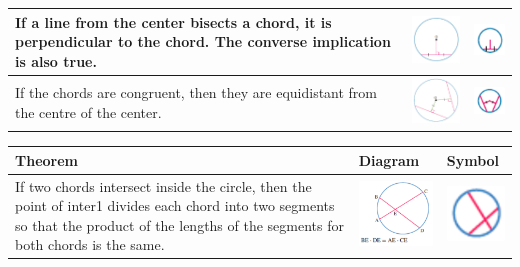 \documentclass{book}
\begin{document}
\begin{center}
\begin{tabular}[center]{|p{5cm}|p{3cm}|p{2cm}|}
		If a line from the center bisects a chord, it is perpendicular to the chord.  The converse implication is also true. & \includegraphics[width=3cm]{circle theorem 4} & \includegraphics[width=2cm]{circle theorem 4 symbol} \\ \hline
		If the chords are congruent, then they are equidistant from the centre of the center.                                & \includegraphics[width=3cm]{circle theorem 5} & \includegraphics[width=2cm]{circle theorem 5 symbol} \\ \hline
	\end{tabular}
	\begin{tabular}[center]{|p{5cm}|p{3cm}|p{2cm}|}
		\hline
		Theorem                                                                                                                                                                                  & Diagram                                        & Symbol                                                \\ \hline
		If two chords intersect inside the circle, then the point of inter1 divides each chord into two segments so that the product of the lengths of the segments for both chords is the same. & \includegraphics[width=3cm]{circle theorem 6}  & \includegraphics[width=2cm]{circle theorem 6 symbol}  \\ \hline

\end{tabular}
\end{center}
\end{document}
